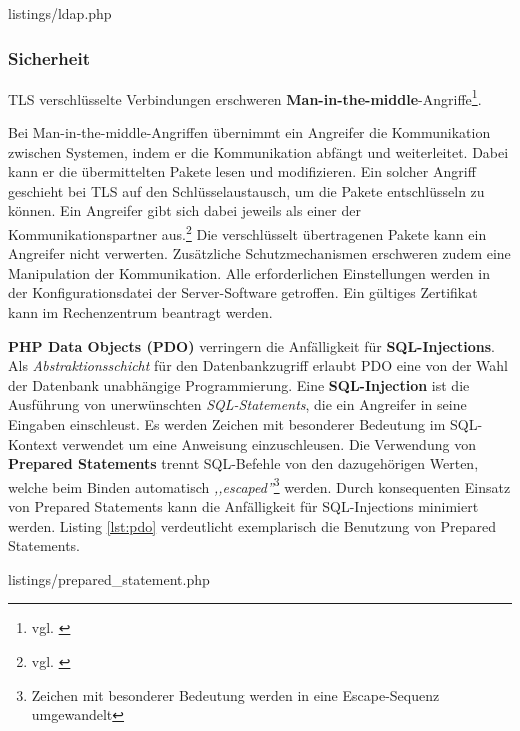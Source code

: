 \documentclass[12pt,a4paper,pointednumbers,abstracton]{scrartcl}
\begin{document}
\begin{minipage}{\textwidth}
	
	{listings/ldap.php}
\end{minipage}


\subsubsection{Sicherheit}
\label{sec:oauth-infrz/security}

TLS verschlüsselte Verbindungen erschweren \textbf{Man-in-the-middle}-Angriffe\footnote{vgl. \cite[Section 10.8]{RFC6749}}.

Bei Man-in-the-middle-Angriffen übernimmt ein Angreifer die Kommunikation zwischen Systemen, indem er die Kommunikation abfängt und weiterleitet.
Dabei kann er die übermittelten Pakete lesen und modifizieren.
Ein solcher Angriff geschieht bei TLS auf den Schlüsselaustausch, um die Pakete entschlüsseln zu können.
Ein Angreifer gibt sich dabei jeweils als einer der Kommunikationspartner aus.\footnote{vgl. \cite[Section 8.7.2]{TW10}}
Die verschlüsselt übertragenen Pakete kann ein Angreifer nicht verwerten.
Zusätzliche Schutzmechanismen erschweren zudem eine Manipulation der  Kommunikation.
Alle erforderlichen Einstellungen werden in der Konfigurationsdatei der Server-Software getroffen.
Ein gültiges Zertifikat kann im Rechenzentrum beantragt werden.

\textbf{PHP Data Objects (PDO)} verringern die Anfälligkeit für \textbf{SQL-Injections}.
Als \emph{Abstraktionsschicht} für den Datenbankzugriff erlaubt PDO eine von der Wahl der Datenbank unabhängige Programmierung.
Eine \textbf{SQL-Injection} ist die Ausführung von unerwünschten \emph{SQL-Statements}, die ein Angreifer in seine Eingaben einschleust.
Es werden Zeichen mit besonderer Bedeutung im SQL-Kontext verwendet um eine Anweisung einzuschleusen.
Die Verwendung von \textbf{Prepared Statements} trennt SQL-Befehle von den dazugehörigen Werten, welche beim Binden automatisch \emph{,,escaped''}\footnote{Zeichen mit besonderer Bedeutung werden in eine Escape-Sequenz umgewandelt} werden.
Durch konsequenten Einsatz von Prepared Statements kann die Anfälligkeit für SQL-Injections minimiert werden.
Listing \ref{lst:pdo} verdeutlicht exemplarisch die Benutzung von Prepared Statements.

\begin{minipage}{\textwidth}
	
	{listings/prepared_statement.php}
\end{minipage}
\end{document}
